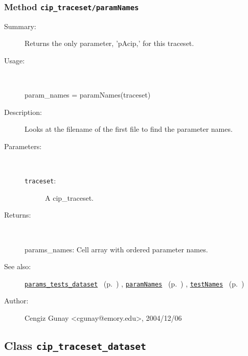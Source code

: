 \subsubsection[Method \texttt{paramNames}]{Method \texttt{cip\_traceset/paramNames}}%
%
\label{ref_cip_traceset__paramNames}%
\hypertarget{ref_cip_traceset__paramNames}{}%
\begin{description}
\item[Summary:]Returns the only parameter, 'pAcip,' for this traceset.
%
\item[Usage:]~%
\begin{lyxcode}%
param\_names = paramNames(traceset)
%
\end{lyxcode}%
%
\item[Description:]%
Looks at the filename of the first file to find the parameter names.
\item[Parameters:]~
\begin{description}%
\item[\texttt{traceset}:]
 A cip\_traceset.
\end{description}%
%
\item[Returns:
]~

	params\_names: Cell array with ordered parameter names.
%
%
\item[See also:]%
\hyperlink{ref_params_tests_dataset}{\texttt{params\_tests\_dataset}}%
\ (p.~\pageref{ref_params_tests_dataset})%
%
, \hyperlink{ref_paramNames}{\texttt{paramNames}}%
\ (p.~\pageref{ref_paramNames})%
%
, \hyperlink{ref_testNames}{\texttt{testNames}}%
\ (p.~\pageref{ref_testNames})%
%
%
\item[Author:]%
Cengiz Gunay <cgunay@emory.edu>, 2004/12/06
%
\end{description}
\methodline%
\subsection{Class \texttt{cip\_traceset\_dataset}}%
%
\label{ref_cip_traceset_dataset}%
\hypertarget{ref_cip_traceset_dataset}{}%
